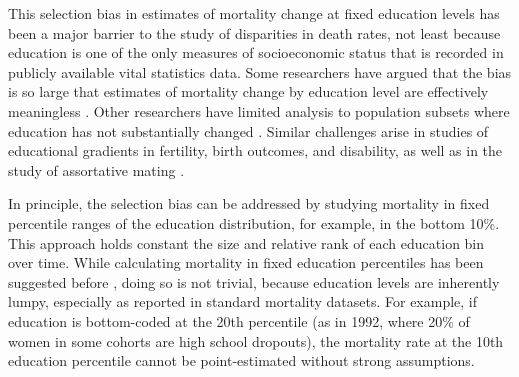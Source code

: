 \documentclass[12pt,letterpaper]{article}
\numberwithin{equation}{section}
\begin{document}
This selection bias in estimates of mortality change at fixed
education levels has been a major barrier to the study of disparities
in death rates, not least because education is one of the only
measures of socioeconomic status that is recorded in publicly
available vital statistics data. Some researchers have argued that the bias is so large that estimates of mortality change by education level are effectively meaningless \citep{Dowd2014,Bound2015,Currie2018}. Other researchers have limited analysis to population subsets where education has not substantially changed \citep{Case2015,Case2017}. Similar challenges arise in studies of educational gradients in fertility, birth outcomes, and disability, as well as in the study of assortative mating \citep{Cutler2010a,Aizer2014,greenwood2014,Bertrand2016}.

In principle, the selection bias can be addressed by studying mortality in fixed percentile ranges of the education distribution, for example, in the bottom 10\%. This approach holds constant the size and relative rank of each education bin over time. While calculating mortality in fixed education percentiles has been suggested before \citep{Bound2015}, doing so is not trivial, because education levels are inherently lumpy, especially as reported in standard mortality datasets. For example, if education is bottom-coded at the 20th percentile (as in 1992, where 20\% of women in some cohorts are high school dropouts), the mortality rate at the 10th education percentile cannot be point-estimated without strong assumptions.
\end{document}
